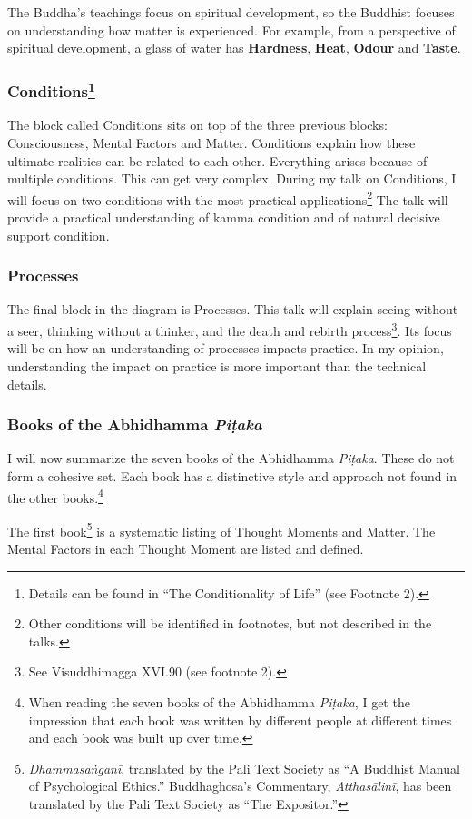 The Buddha’s teachings focus on spiritual development, so the Buddhist focuses on understanding how matter is experienced. For example, from a perspective of spiritual development, a glass of water has \textbf{Hardness}, \textbf{Heat}, \textbf{Odour} and \textbf{Taste}.

\subsubsection*{Conditions\footnote{Details can be found in “The Conditionality of Life” (see Footnote 2).}}

The block called Conditions sits on top of the three previous blocks: Consciousness, Mental Factors and Matter. Conditions explain how these ultimate realities can be related to each other. Everything arises because of multiple conditions. This can get very complex. During my talk on Conditions, I will focus on two conditions with the most practical applications\footnote{Other conditions will be identified in footnotes, but not described in the talks.} The talk will provide a practical understanding of kamma condition and of natural decisive support condition. 

\subsubsection*{Processes}

The final block in the diagram is Processes. This talk will explain seeing without a seer, thinking without a thinker, and the death and rebirth process\footnote{See Visuddhimagga XVI.90 (see footnote 2).}. Its focus will be on how an understanding of processes impacts practice. In my opinion, understanding the impact on practice is more important than the technical details.

\subsubsection*{Books of the Abhidhamma \textit{Piṭaka}}

I will now summarize the seven books of the Abhidhamma \textit{Piṭaka}. These do not form a cohesive set. Each book has a distinctive style and approach not found in the other books.\footnote{When reading the seven books of the Abhidhamma \textit{Piṭaka}, I get the impression that each book was written by different people at different times and each book was built up over time.}

The first book\footnote{\textit{Dhammasaṅgaṇī}, translated by the Pali Text Society as “A Buddhist Manual of Psychological Ethics.” Buddhaghosa’s Commentary, \textit{Atthasālinī}, has been translated by the Pali Text Society as “The Expositor.”} is a systematic listing of Thought Moments and Matter. The Mental Factors in each Thought Moment are listed and defined. 


